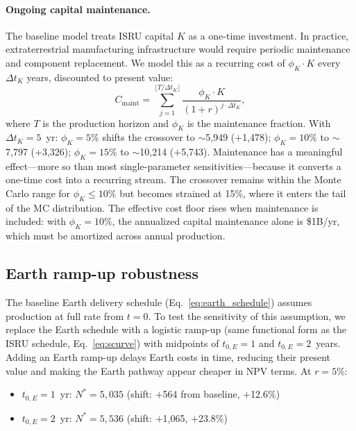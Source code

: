 \documentclass[preprint,12pt]{elsarticle}
\begin{document}
\paragraph{Ongoing capital maintenance.} The baseline model treats ISRU capital $K$ as a one-time investment. In practice, extraterrestrial manufacturing infrastructure would require periodic maintenance and component replacement. We model this as a recurring cost of $\phi_K \cdot K$ every $\Delta t_K$ years, discounted to present value:
\begin{equation}
  C_{\mathrm{maint}} = \sum_{j=1}^{\lfloor T/\Delta t_K \rfloor} \frac{\phi_K \cdot K}{(1+r)^{j \cdot \Delta t_K}},
\end{equation}
where $T$ is the production horizon and $\phi_K$ is the maintenance fraction. With $\Delta t_K = 5$~yr: $\phi_K = 5\%$ shifts the crossover to $\sim$5{,}949 ($+$1{,}478); $\phi_K = 10\%$ to $\sim$7{,}797 ($+$3{,}326); $\phi_K = 15\%$ to $\sim$10{,}214 ($+$5{,}743). Maintenance has a meaningful effect---more so than most single-parameter sensitivities---because it converts a one-time cost into a recurring stream. The crossover remains within the Monte Carlo range for $\phi_K \leq 10\%$ but becomes strained at 15\%, where it enters the tail of the MC distribution. The effective cost floor rises when maintenance is included: with $\phi_K = 10\%$, the annualized capital maintenance alone is \$1B/yr, which must be amortized across annual production.

\subsection{Earth ramp-up robustness}
\label{sec:earth_ramp}

The baseline Earth delivery schedule (Eq.~\ref{eq:earth_schedule}) assumes production at full rate from $t = 0$. To test the sensitivity of this assumption, we replace the Earth schedule with a logistic ramp-up (same functional form as the ISRU schedule, Eq.~\ref{eq:scurve}) with midpoints of $t_{0,E} = 1$ and $t_{0,E} = 2$~years. Adding an Earth ramp-up delays Earth costs in time, reducing their present value and making the Earth pathway appear cheaper in NPV terms. At $r = 5\%$:

\begin{itemize}
\item $t_{0,E} = 1$~yr: $N^* = 5{,}035$ (shift: $+$564 from baseline, $+$12.6\%)
\item $t_{0,E} = 2$~yr: $N^* = 5{,}536$ (shift: $+$1{,}065, $+$23.8\%)
\end{itemize}
\end{document}
